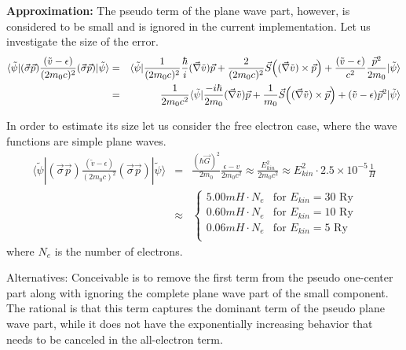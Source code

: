 \documentclass[11pt,a4paper]{report}
\begin{document}
\textbf{Approximation:}
The pseudo term of the plane wave part, however, is considered to be
small and is ignored in the current implementation. Let us investigate
the size of the error.
\begin{eqnarray*}
\langle\tilde\psi|
(\vec{\sigma}\vec{p})\frac{(\tilde{v}-\epsilon)}{(2m_0c)^2}(\vec{\sigma}\vec{p})
|\tilde{\psi}\rangle &=& \langle\tilde\psi|
\frac{1}{(2m_0c)^2}\frac{\hbar}{i}(\vec{\nabla}\tilde{v})\vec{p}
+\frac{2}{(2m_0c)^2}
\vec{S}\Bigl((\vec{\nabla}\tilde{v})\times\vec{p}\Bigr)
+\frac{(\tilde{v}-\epsilon)}{c^2} \frac{\vec{p}^2}{2m_0}
|\tilde{\psi}\rangle \nonumber\\ &=&
\frac{1}{2m_0c^2}\langle\tilde\psi|
\frac{-i\hbar}{2m_0}(\vec{\nabla}\tilde{v})\vec{p} +\frac{1}{m_0}
\vec{S}\Bigl((\vec{\nabla}\tilde{v})\times\vec{p}\Bigr)
+(\tilde{v}-\epsilon)\vec{p}^2 |\tilde{\psi}\rangle
\end{eqnarray*}


In order to estimate its size let us consider the free electron case,
where the wave functions are simple plane waves.
\begin{eqnarray*}
\langle\tilde\psi|
(\vec{\sigma}\vec{p})\frac{(\tilde{v}-\epsilon)}{(2m_0c)^2}(\vec{\sigma}\vec{p})
|\tilde{\psi}\rangle
&=&\frac{(\hbar\vec{G})^2}{2m_0}\frac{\epsilon-v}{2m_0c^2}
\approx \frac{E_{kin}^2}{2m_0c^2}\approx E^2_{kin} \cdot 2.5
\times10^{-5}\frac{1}{H}
\nonumber\\
&\approx&
\begin{cases}
5.00 mH\cdot N_e &\text{for $E_{kin}=30$~Ry}\\
0.60 mH\cdot N_e &\text{for $E_{kin}=10$~Ry}\\
0.06 mH\cdot N_e &\text{for $E_{kin}=5$~Ry}\\
\end{cases}
\end{eqnarray*}
where $N_e$ is the number of electrons.

Alternatives: Conceivable is to remove the first term from the pseudo
one-center part along with ignoring the complete plane wave part of
the small component. The rational is that this term captures the
dominant term of the pseudo plane wave part, while it does not have
the exponentially increasing behavior that needs to be canceled in the
all-electron term.
\end{document}
